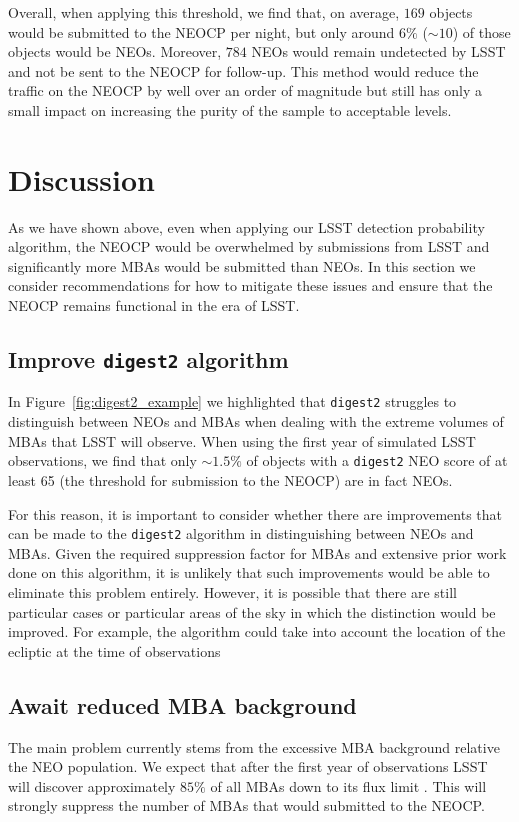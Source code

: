 \documentclass[twocolumn]{aastex631}
\newcommand{\needcite}{{\color{magenta}{(needs citation)}}}
\newcommand{\dig}{\texttt{digest2}}
\begin{document}
Overall, when applying this threshold, we find that, on average, $169$ objects would be submitted to the NEOCP per night, but only around $6\%$ (${\sim}10$) of those objects would be NEOs. Moreover, $784$ NEOs would remain undetected by LSST and not be sent to the NEOCP for follow-up. This method would reduce the traffic on the NEOCP by well over an order of magnitude but still has only a small impact on increasing the purity of the sample to acceptable levels.

\section{Discussion} \label{sec:discussion}
As we have shown above, even when applying our LSST detection probability algorithm, the NEOCP would be overwhelmed by submissions from LSST and significantly more MBAs would be submitted than NEOs. In this section we consider recommendations for how to mitigate these issues and ensure that the NEOCP remains functional in the era of LSST.

\subsection{Improve \dig{} algorithm}
In Figure~\ref{fig:digest2_example} we highlighted that \dig{} struggles to distinguish between NEOs and MBAs when dealing with the extreme volumes of MBAs that LSST will observe. When using the first year of simulated LSST observations, we find that only ${\sim}1.5\%$ of objects with a \dig{} NEO score of at least 65 (the threshold for submission to the NEOCP) are in fact NEOs.

For this reason, it is important to consider whether there are improvements that can be made to the \dig{} algorithm in distinguishing between NEOs and MBAs. Given the required suppression factor for MBAs and extensive prior work done on this algorithm, it is unlikely that such improvements would be able to eliminate this problem entirely. However, it is possible that there are still particular cases or particular areas of the sky in which the distinction would be improved. For example, the algorithm could take into account the location of the ecliptic at the time of observations

\subsection{Await reduced MBA background}
The main problem currently stems from the excessive MBA background relative the NEO population. We expect that after the first year of observations LSST will discover approximately $85\%$ of all MBAs down to its flux limit \needcite{}. This will strongly suppress the number of MBAs that would submitted to the NEOCP.
\end{document}
